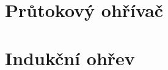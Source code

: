\documentclass{article}
\begin{document}



\maketitle
\tableofcontents
\newpage



\section{Průtokový ohřívač \spicy \spicy \spicy \spicy}



\section{Indukční ohřev \spicy \spicy \spicy \spicy \spicy}
\end{document}
